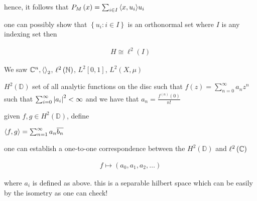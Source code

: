 hence, it follows that $P_{M} \left( x \right) = \sum_{i\in I} {\left\langle x,u_{i} \right\rangle}u_{i}$

\horz

one can possibly show that $\left\{ u_{i} : i \in I \right\}$ is an orthonormal set where $I$ is any indexing set then 

\begin{align*}
    H \cong \ell ^{2} \left( I \right)
\end{align*}


\horz


We saw $\mathbb C ^{n}, \left\langle  \right\rangle_{2}$, $\ell ^{2} \left( \mathbb N \right)$, $L^{2}[0,1]$, $L^{2} \left( X, \mu \right)$


$H^{2} \left( \mathbb D \right)$ set of all analytic functions on the disc such that $f(z)= \sum_{n=0}^{\infty} a_{n} z^{n}$ such that $\sum_{i=0}^{\infty} \left\lvert a_{i} \right\rvert^{2} < \infty$ and we have that $a_{n} = \frac{f^{\left( n \right)}\left( 0 \right) }{n!}$

given $f,g \in H^{2} \left( \mathbb D \right)$, define

$\left\langle f,g \right\rangle = \sum_{n=1}^{\infty} a_{n} \overline{b_{n}}$

one can establish a one-to-one correspondence between the $H^{2} \left( \mathbb D \right)$ and $\ell ^{2} \left( \mathbb C \right)$

\begin{align*}
    f \mapsto \left( a_{0} , a_{1}, a_{2} , \ldots \right)
\end{align*}

where $a_i$ is defined as above. this is a separable hilbert space which can be easily by the isometry as one can check!


